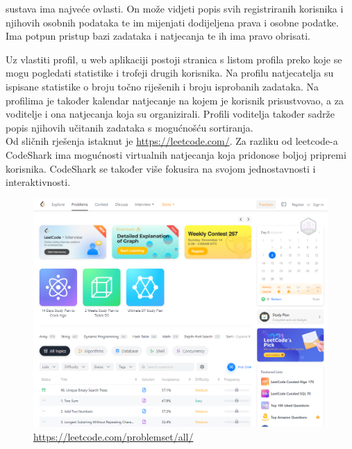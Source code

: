 		
		
		\textit{} sustava ima najveće ovlasti. On može vidjeti popis svih registriranih korisnika i njihovih osobnih podataka te im mijenjati dodijeljena prava i osobne podatke. Ima potpun pristup bazi zadataka i natjecanja te ih ima pravo obrisati.
		
		
		\eject
		
		Uz vlastiti profil, u web aplikaciji postoji stranica s listom profila preko koje se mogu pogledati statistike i trofeji drugih korisnika.
		Na profilu natjecatelja su ispisane statistike o broju točno riješenih i broju isprobanih zadataka. Na profilima je također kalendar natjecanje na kojem je korisnik prisustvovao, a za voditelje i ona natjecanja koja su organizirali. Profili voditelja također sadrže popis njihovih učitanih zadataka s mogućnošću sortiranja.
		\\
		
		\noindent	Od sličnih rješenja istaknut je \url{https://leetcode.com/}. Za razliku od leetcode-a CodeShark ima mogućnosti virtualnih natjecanja koja pridonose boljoj pripremi korisnika. CodeShark se također više fokusira na svojom jednostavnosti i interaktivnosti.
		
		\begin{figure}[H]
			\includegraphics[width=\textwidth]{slike/leetcode.PNG} %
			\caption{\url{https://leetcode.com/problemset/all/}}
			\label{fig:leetcode} %
		\end{figure}
		
		
		
		
		
	
		
	
		
	
